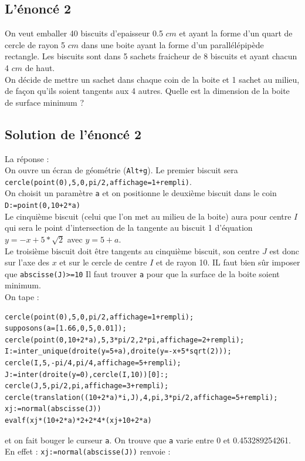 \documentclass[a4paper,11pt]{book}
\begin{document}
\subsection{L'\'enonc\'e 2}
On veut emballer 40 biscuits d'epaisseur 0.5 $cm$ et ayant la forme d'un quart 
de cercle de rayon 5 $cm$ dans une boite ayant la forme d'un 
parall\'el\'epip\`ede rectangle. Les biscuits sont dans 5 sachets fraicheur de 
8 biscuits et ayant chacun 4 $cm$ de haut.\\
 On d\'ecide de mettre un sachet dans chaque coin de la boite et 1 sachet 
au milieu, de fa\c{c}on qu'ils soient tangents aux 4 autres.
Quelle est la dimension de la boite de surface minimum ?
\subsection{Solution de l'\'enonc\'e 2}
La r\'eponse :\\
On ouvre un \'ecran de g\'eom\'etrie ({\tt Alt+g}).
Le premier biscuit sera {\tt cercle(point(0),5,0,pi/2,affichage=1+rempli)}. \\
On choisit un param\`etre {\tt a} et on positionne le deuxi\`eme biscuit dans 
le coin  {\tt D:=point(0,10+2*a)}\\
Le cinqui\`eme biscuit (celui que l'on met au milieu de la boite) aura pour 
centre $I$ qui sera le point d'intersection de la tangente au biscuit 1 
d'\'equation $y=-x+5*\sqrt 2$ avec $y=5+a$.\\
Le troisi\`eme biscuit doit \^etre tangents au cinqui\`eme biscuit, son 
centre $J$ est donc sur l'axe des $x$ et sur le cercle de centre $I$ et de 
rayon 10. IL faut bien s\^ur imposer que {\tt abscisse(J)>=10}
Il faut trouver {\tt a} pour que la surface de la boite soient minimum.\\
On tape :
\begin{verbatim} 
cercle(point(0),5,0,pi/2,affichage=1+rempli);
supposons(a=[1.66,0,5,0.01]);
cercle(point(0,10+2*a),5,3*pi/2,2*pi,affichage=2+rempli);
I:=inter_unique(droite(y=5+a),droite(y=-x+5*sqrt(2)));
cercle(I,5,-pi/4,pi/4,affichage=5+rempli);
J:=inter(droite(y=0),cercle(I,10))[0]:;
cercle(J,5,pi/2,pi,affichage=3+rempli);
cercle(translation((10+2*a)*i,J),4,pi,3*pi/2,affichage=5+rempli);
xj:=normal(abscisse(J))
evalf(xj*(10+2*a)*2+2*4*(xj+10+2*a)
\end{verbatim}
et on fait bouger le curseur {\tt a}. 
On trouve que {\tt a} varie entre 0 et 0.453289254261.\\
En effet :
{\tt xj:=normal(abscisse(J))} renvoie :\\
\end{document}
